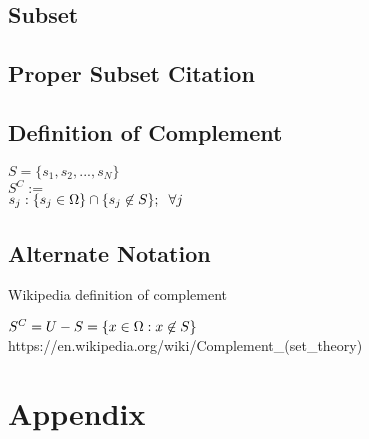 \documentclass[11pt]{article}
\begin{document}
\subsection{Subset}



\subsection{Proper Subset Citation}




\subsection{Definition of Complement}
\begin{center}
$
S = \{ s_1,s_2,...,s_N \}
$
\\
$
S^C :=
$
\\
$
s_j: \{ s_j \in \Omega\} \cap \{s_j \not \in S\}; \hspace{2mm} \forall j
$
\end{center}
\subsection{Alternate Notation}
Wikipedia definition of complement
\begin{center}
$
S^C = U - S = \{x \in \Omega : x \not \in S\} \hspace{3mm} 
$
https://en.wikipedia.org/wiki/Complement\_(set\_theory)
\end{center}




\newpage
\section*{Appendix}
\end{document}
